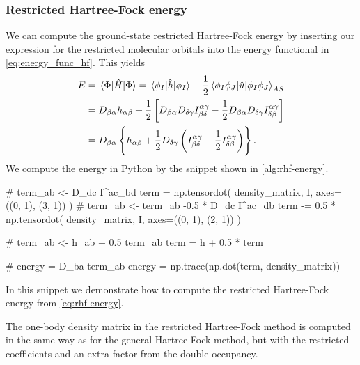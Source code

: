             \subsubsection{Restricted Hartree-Fock energy}
                We can compute the ground-state restricted Hartree-Fock energy
                by inserting our expression for the restricted molecular
                orbitals into the energy functional in
                \autoref{eq:energy_func_hf}.
                This yields
                \begin{align}
                    E
                    &= \mel{\Phi}{\hat{H}}{\Phi}
                    = \mel{\phi_I}{\hat{h}}{\phi_I}
                    + \frac{1}{2}
                    \mel{\phi_I\phi_J}{
                        \hat{u}}{\phi_I\phi_J}_{AS}
                    \\
                    &=
                    D_{\beta\alpha}
                    h_{\alpha\beta}
                    + \frac{1}{2}\left[ 
                        D_{\beta\alpha}
                        D_{\delta\gamma}
                        I^{\alpha\gamma}_{\beta\delta}
                        - \frac{1}{2}
                        D_{\beta\alpha}
                        D_{\delta\gamma}
                        I^{\alpha\gamma}_{\delta\beta}
                     \right]
                    \\
                    &=
                    D_{\beta\alpha}
                    \left\{ 
                        h_{\alpha\beta}
                        + \frac{1}{2} D_{\delta\gamma}
                        \left( 
                            I^{\alpha\gamma}_{\beta\delta}
                            - \frac{1}{2}
                            I^{\alpha\gamma}_{\delta\beta}
                         \right)
                     \right\}.
                    \label{eq:rhf-energy}
                \end{align}
                We compute the energy in Python by the snippet shown in
                \autoref{alg:rhf-energy}.
                \begin{algorithm}
                    \begin{python}
# term_{ab} <- D_{dc} I^{ac}_{bd}
term = np.tensordot(
    density_matrix, I, axes=((0, 1), (3, 1))
)
# term_{ab} <- term_{ab} -0.5 * D_{dc} I^{ac}_{db}
term -= 0.5 * np.tensordot(
    density_matrix, I, axes=((0, 1), (2, 1))
)

# term_{ab} <- h_{ab} + 0.5 term_{ab}
term = h + 0.5 * term

# energy = D_{ba} term_{ab}
energy = np.trace(np.dot(term, density_matrix))
                    \end{python}
                    \caption{In this snippet we demonstrate how to compute the
                    restricted Hartree-Fock energy from
                    \autoref{eq:rhf-energy}.}
                    \label{alg:rhf-energy}
                \end{algorithm}
                The one-body density matrix in the restricted Hartree-Fock
                method is computed in the same way as for the general
                Hartree-Fock method, but with the restricted coefficients and an
                extra factor from the double occupancy.

